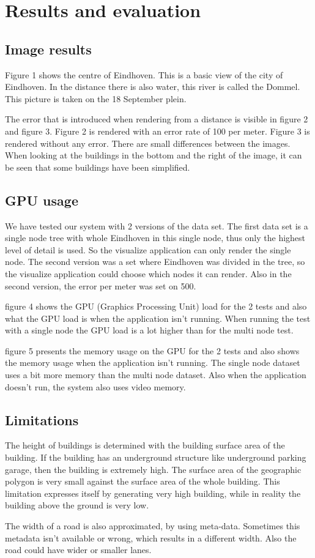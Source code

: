 \chapter{Results and evaluation}
\section{Image results}
Figure 1 shows the centre of Eindhoven. This is a basic view of the city of Eindhoven. In the distance there is also water, this river is called the Dommel. This picture is taken on the 18 September plein.

The error that is introduced when rendering from a distance is visible in figure 2 and figure 3. Figure 2 is rendered with an error rate of 100 per meter. Figure 3 is rendered without any error. There are small differences between the images. When looking at the buildings in the bottom and the right of the image, it can be seen that some buildings have been simplified.

\section{GPU usage}
We have tested our system with 2 versions of the data set. The first data set is a single node tree with whole Eindhoven in this single node, thus only the highest level of detail is used. So the visualize application can only render the single node. The second version was a set where Eindhoven was divided in the tree, so the visualize application could choose which nodes it can render. Also in the second version, the error per meter was set on 500.

figure 4 shows the GPU (Graphics Processing Unit) load for the 2 tests and also what the GPU load is when the application isn’t running. When running the test with a single node the GPU load is a lot higher than for the multi node test.

figure 5 presents the memory usage on the GPU for the 2 tests and also shows the memory usage when the application isn’t running. The single node dataset uses a bit more memory than the multi node dataset. Also when the application doesn’t run, the system also uses video memory.

\section{Limitations}
The height of buildings is determined with the building surface area of the building. If the building has an underground structure like underground parking garage, then the building is extremely high. The surface area of the geographic polygon is very small against the surface area of the whole building. This limitation expresses itself by generating very high building, while in reality the building above the ground is very low.

The width of a road is also approximated, by using meta-data. Sometimes this metadata isn’t available or wrong, which results in a different width. Also the road could have wider or smaller lanes.

